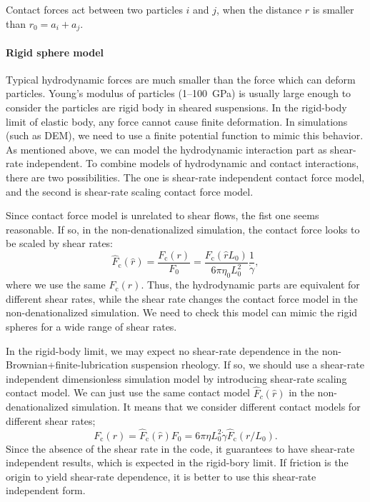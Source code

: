 \documentclass{article}
\begin{document}
Contact forces act between
two particles $i$ and $j$,
when the distance $r$
is smaller than $r_0 = a_i + a_j$.

\paragraph{Rigid sphere model}

Typical hydrodynamic forces
are much smaller than
the force which can deform particles.
%
Young's modulus of particles
(1--100~GPa) is usually large enough
to consider the particles are rigid body
in sheared suspensions.
%
In the rigid-body limit of elastic body,
any force cannot cause finite deformation.
%
In simulations (such as DEM),
we need to use a finite potential function
to mimic this behavior.
%
As mentioned above,
we can model the hydrodynamic interaction part
as shear-rate independent.
%
To combine models of hydrodynamic and
contact interactions,
there are two possibilities.
%
The one is shear-rate independent contact force model,
and the second is shear-rate scaling contact force model.
%

Since contact force model
is unrelated to shear flows,
the fist one seems reasonable.
%
If so,
in the non-denationalized simulation,
the contact force looks to be scaled by shear rates:
\begin{equation}
  \hat{F}_{\mathrm{c}}(\hat{r}) = \frac{F_{\mathrm{c}}(r) }{F_0}
  = \frac{F_{\mathrm{c}}(\hat{r}L_0) }{6 \pi \eta_0 L_0^2  } 
  \frac{1}{\dot{\gamma}},
\end{equation}
%
where we use the same $F_{\mathrm{c}}(r)$.
Thus,
the hydrodynamic parts 
are equivalent for different shear rates,
while
the shear rate changes the contact force model
in the non-denationalized simulation.
%
We need to check
this model can mimic the rigid spheres
for a wide range of shear rates.
%



In the rigid-body limit,
we may expect
no shear-rate dependence
in the non-Brownian+finite-lubrication suspension rheology.
%
If so, 
we should use
a shear-rate independent dimensionless simulation model
by introducing shear-rate scaling contact model.
%
We can just use the same contact model
$\hat{F}_c(\hat{r})$
in the non-denationalized simulation.
%
It means that 
we consider 
different contact models
for different shear rates;
\begin{equation}
 F_{\mathrm{c}}(r) = \hat{F}_{\mathrm{c}}(\hat{r}) F_0
= 6 \pi \eta L_0^2 \dot{\gamma} 
\hat{F}_{\mathrm{c}}(r/L_0).
\end{equation}
%
Since the absence of the shear rate in the code,
it guarantees to have shear-rate independent results,
which is expected in the rigid-bory limit.
%
If friction is the origin
to yield shear-rate dependence,
it is better to use
this shear-rate independent form.
%
\end{document}
